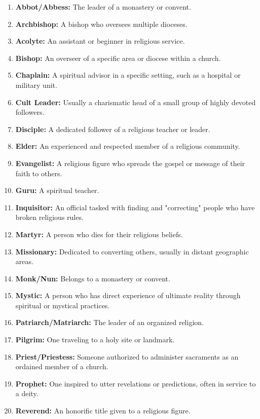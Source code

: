 \documentclass[12pt]{book}  %
\begin{document}
\begin{enumerate}
    \item \textbf{Abbot/Abbess:} The leader of a monastery or convent.
    \item \textbf{Archbishop:} A bishop who oversees multiple dioceses.
    \item \textbf{Acolyte:} An assistant or beginner in religious service.
    \item \textbf{Bishop:} An overseer of a specific area or diocese within a church.
    \item \textbf{Chaplain:} A spiritual advisor in a specific setting, such as a hospital or military unit.
    \item \textbf{Cult Leader:} Usually a charismatic head of a small group of highly devoted followers.
    \item \textbf{Disciple:} A dedicated follower of a religious teacher or leader.
    \item \textbf{Elder:} An experienced and respected member of a religious community.
    \item \textbf{Evangelist:} A religious figure who spreads the gospel or message of their faith to others.
    \item \textbf{Guru:} A spiritual teacher.
    \item \textbf{Inquisitor:} An official tasked with finding and "correcting" people who have broken religious rules.
    \item \textbf{Martyr:} A person who dies for their religious beliefs.
    \item \textbf{Missionary:} Dedicated to converting others, usually in distant geographic areas.
    \item \textbf{Monk/Nun:} Belongs to a monastery or convent.
    \item \textbf{Mystic:} A person who has direct experience of ultimate reality through spiritual or mystical practices.
    \item \textbf{Patriarch/Matriarch:} The leader of an organized religion.
    \item \textbf{Pilgrim:} One traveling to a holy site or landmark.
    \item \textbf{Priest/Priestess:} Someone authorized to administer sacraments as an ordained member of a church.
    \item \textbf{Prophet:} One inspired to utter revelations or predictions, often in service to a deity.
    \item \textbf{Reverend:} An honorific title given to a religious figure.

\end{enumerate}
\end{document}
